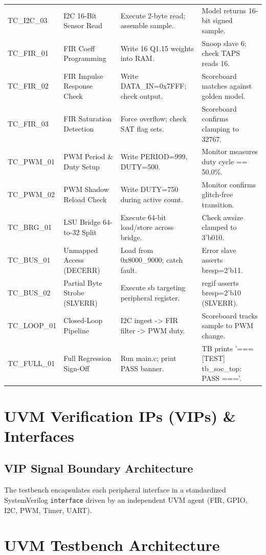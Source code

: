 \documentclass[12pt,a4paper,oneside]{report}
\begin{document}
\begin{table}[htbp]
\begin{tabularx}{\textwidth}{llXX}
TC\_I2C\_03 & I2C 16-Bit Sensor Read & Execute 2-byte read; assemble sample. & Model returns 16-bit signed sample. \\
TC\_FIR\_01 & FIR Coeff Programming & Write 16 Q1.15 weights into RAM. & Snoop slave 6; check TAPS reads 16. \\
TC\_FIR\_02 & FIR Impulse Response Check & Write DATA\_IN=0x7FFF; check output. & Scoreboard matches against golden model. \\
TC\_FIR\_03 & FIR Saturation Detection & Force overflow; check SAT flag sets. & Scoreboard confirms clamping to 32767. \\
TC\_PWM\_01 & PWM Period \& Duty Setup & Write PERIOD=999, DUTY=500. & Monitor measures duty cycle == 50.0\%. \\
TC\_PWM\_02 & PWM Shadow Reload Check & Write DUTY=750 during active count. & Monitor confirms glitch-free transition. \\
TC\_BRG\_01 & LSU Bridge 64-to-32 Split & Execute 64-bit load/store across bridge. & Check awsize clamped to 3'b010. \\
TC\_BUS\_01 & Unmapped Access (DECERR) & Load from 0x8000\_9000; catch fault. & Error slave asserts bresp=2'b11. \\
TC\_BUS\_02 & Partial Byte Strobe (SLVERR) & Execute sb targeting peripheral register. & regif asserts bresp=2'b10 (SLVERR). \\
TC\_LOOP\_01 & Closed-Loop Pipeline & I2C ingest -> FIR filter -> PWM duty. & Scoreboard tracks sample to PWM change. \\
TC\_FULL\_01 & Full Regression Sign-Off & Run main.c; print PASS banner. & TB prints '=== [TEST] tb\_soc\_top: PASS ==='. \\
\bottomrule
\end{tabularx}
\end{table}

\chapter{UVM Verification IPs (VIPs) \& Interfaces}
\section{VIP Signal Boundary Architecture}
The testbench encapsulates each peripheral interface in a standardized SystemVerilog \texttt{interface} driven by an independent UVM agent (FIR, GPIO, I2C, PWM, Timer, UART).

\chapter{UVM Testbench Architecture}
\end{document}
